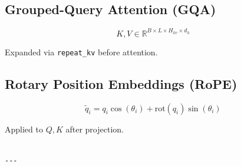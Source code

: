 \subsection{Grouped-Query Attention (GQA)}

\[
K, V \in \mathbb{R}^{B \times L \times H_{kv} \times d_h}
\tag{3.7}
\]

Expanded via \texttt{repeat\_kv} before attention.

\subsection{Rotary Position Embeddings (RoPE)}

\[
\tilde{q}_i = q_i \cos(\theta_i) + \text{rot}(q_i) \sin(\theta_i)
\tag{3.8}
\]

Applied to $Q, K$ after projection.
\begin{lstlisting}

---
\end{lstlisting}